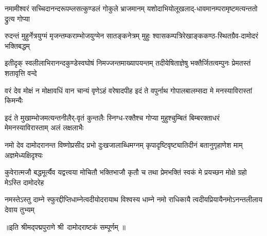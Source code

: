 
\fourlineindentedshloka
{नमामीश्वरं सच्चिदानन्दरूपम्}{लसत्कुण्डलं गोकुले भ्राजमानम्}
{यशोदाभियोलूखलाद्-धावमानम्}{परामृष्टमत्यन्ततो द्रुत्य गोप्या}

\fourlineindentedshloka
{रुदन्तं मुहुर्नेत्रयुग्मं मृजन्तम्}{कराम्भोजयुग्मेन सातङ्कनेत्रम्}
{मुहुः श्वासकम्पत्रिरेखाङ्ककण्ठ-}{स्थितग्रैव-दामोदरं भक्तिबद्धम्}

\fourlineindentedshloka
{इतीदृक् स्वलीलाभिरानन्दकुण्डे}{स्वघोषं निमज्जन्तमाख्यापयन्तम्}
{तदीयेषिताज्ञेषु भक्तैर्जितत्वम्}{पुनः प्रेमतस्तं शतावृत्ति वन्दे}

\fourlineindentedshloka
{वरं देव मोक्षं न मोक्षावधिं वा}{न चान्यं वृणेऽहं वरेषादपीह}
{इदं ते वपुर्नाथ गोपालबालम्}{सदा मे मनस्याविरास्तां किमन्यैः}

\fourlineindentedshloka
{इदं ते मुखाम्भोजमत्यन्तनीलैर्-}{वृतं कुन्तलैः स्निग्ध-रक्तैश्च गोप्या}
{मुहुश्चुम्बितं बिम्बरक्ताधरं मे}{मनस्याविरास्ताम् अलं लक्षलाभैः}

\fourlineindentedshloka
{नमो देव दामोदरानन्त विष्णो}{प्रसीद प्रभो दुःखजालाब्धिमग्नम्}
{कृपादृष्टिवृष्ट्यातिदीनं बतानु}{गृहाणेश माम् अज्ञमेध्यक्षिदृश्यः}

\fourlineindentedshloka
{कुवेरात्मजौ बद्धमूर्त्यैव यद्वत्}{त्वया मोचितौ भक्तिभाजौ कृतौ च}
{तथा प्रेमभक्तिं स्वकं मे प्रयच्छ}{न मोक्षे ग्रहो मेऽस्ति दामोदरेह}

\fourlineindentedshloka
{नमस्तेऽस्तु दाम्ने स्फुरद्दीप्तिधाम्ने}{त्वदीयोदरायाथ विश्वस्य धाम्ने}
{नमो राधिकायै त्वदीयप्रियायै}{नमोऽनन्तलीलाय देवाय तुभ्यम्}

{॥इति श्रीमद्पद्मपुराणे श्री~दामोदराष्टकं सम्पूर्णम् ॥}